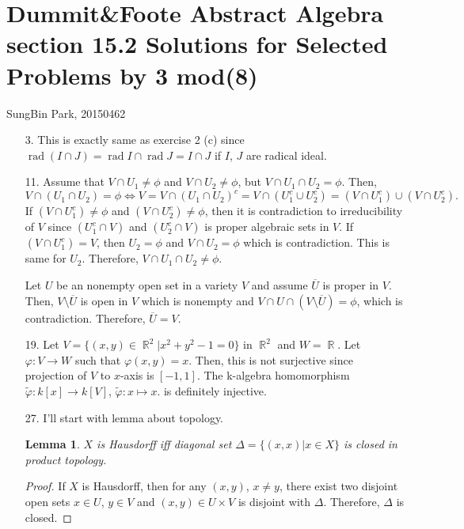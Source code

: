 \documentclass[12pt]{article}
\DeclareMathOperator{\rr}{\mathbb{R}}
\DeclareMathOperator{\rad}{\mathrm{rad}}
\newtheorem{lemma}{Lemma}
\begin{document}
\section*{Dummit\&Foote Abstract Algebra section 15.2 Solutions for Selected Problems by 3 mod(8)}
SungBin Park, 20150462
\begin{enumerate}
\item[3.] This is exactly same as exercise 2 (c) since $\rad(I\cap J)=\rad I\cap \rad J=I\cap J$ if $I$, $J$ are radical ideal.
\newpage
\item[11.]
Assume that $V\cap U_1\neq \phi$ and $V\cap U_2\neq \phi$, but $V\cap U_1\cap U_2=\phi$. Then,
\begin{equation*}
V\cap\left(U_1\cap U_2\right)=\phi \Leftrightarrow V=V\cap\left(U_1\cap U_2\right)^c=V\cap\left(U_1^c\cup U_2^c\right)=\left(V\cap U_1^c\right)\cup \left(V\cap U_2^c\right).
\end{equation*}
If $\left(V\cap U_1^c\right)\neq \phi$ and $\left(V\cap U_2^c\right)\neq \phi$, then  it is contradiction to irreducibility of $V$ since $(U^c_1\cap V)$ and $(U^c_2\cap V)$ is proper algebraic sets in $V$.  If $(V\cap U^c_1)=V$, then $U_2=\phi$ and $V\cap U_2=\phi$ which is contradiction. This is same for $U_2$. Therefore, $V\cap U_1\cap U_2\neq \phi$.

Let $U$ be an nonempty open set in a variety $V$ and assume $\overline{U}$ is proper in $V$. Then, $V\setminus \overline{U}$ is open in $V$ which is nonempty and $V\cap U\cap \left(V\setminus \overline{U}\right)=\phi$, which is contradiction. Therefore, $\overline{U}=V$.
\newpage
\item[19.] Let $V=\{(x,y)\in \rr^2|x^2+y^2-1=0\}$ in $\rr^2$ and $W=\rr$. Let $\varphi:V\rightarrow W$ such that $\varphi(x,y)=x$. Then, this is not surjective since projection of $V$ to $x$-axis is $[-1, 1]$. The k-algebra homomorphism $\tilde{\varphi}:k[x]\rightarrow k[V]$, $\tilde{\varphi}:x\mapsto x$. is definitely injective.
\newpage
\item[27.]
I'll start with lemma about topology.
\begin{lemma}
$X$ is Hausdorff iff diagonal set $\Delta=\{(x,x)|x\in X\}$ is closed in product topology.
\end{lemma}
\begin{proof}
If $X$ is Hausdorff, then for any $(x,y)$, $x\neq y$, there exist two disjoint open sets $x\in U$, $y\in V$ and $(x,y)\in U\times V$ is disjoint with $\Delta$. Therefore, $\Delta$ is closed.


\end{proof}
\end{enumerate}
\end{document}

